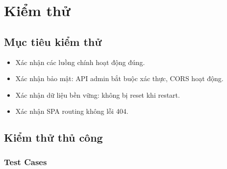 \documentclass[12pt,a4paper,oneside]{report}
\begin{document}
\chapter{Kiểm thử}

\section{Mục tiêu kiểm thử}

\begin{itemize}[itemsep=2pt]
  \item Xác nhận các luồng chính hoạt động đúng.
  \item Xác nhận bảo mật: API admin bắt buộc xác thực, CORS hoạt động.
  \item Xác nhận dữ liệu bền vững: không bị reset khi restart.
  \item Xác nhận SPA routing không lỗi 404.
\end{itemize}

\section{Kiểm thử thủ công}

\subsection{Test Cases}
\end{document}
